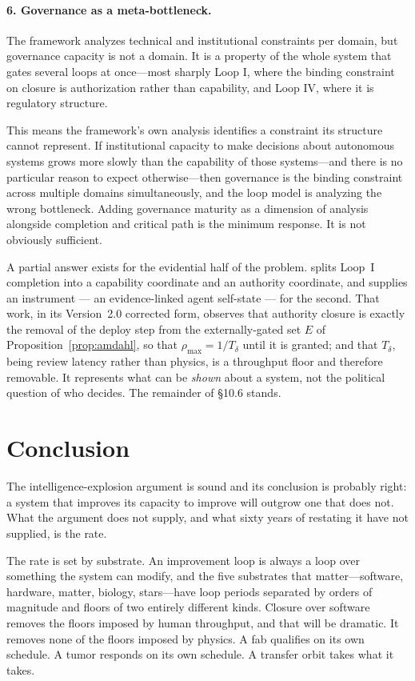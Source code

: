 \documentclass[11pt]{article}
\begin{document}
\paragraph{6. Governance as a meta-bottleneck.} The framework analyzes technical and institutional constraints per domain, but governance capacity is not a domain. It is a property of the whole system that gates several loops at once---most sharply Loop I, where the binding constraint on closure is authorization rather than capability, and Loop IV, where it is regulatory structure.

This means the framework's own analysis identifies a constraint its structure cannot represent. If institutional capacity to make decisions about autonomous systems grows more slowly than the capability of those systems---and there is no particular reason to expect otherwise---then governance is the binding constraint across multiple domains simultaneously, and the loop model is analyzing the wrong bottleneck. Adding governance maturity as a dimension of analysis alongside completion and critical path is the minimum response. It is not obviously sufficient.

A partial answer exists for the evidential half of the problem. \citet{yang2026selfaware} splits Loop~I completion into a capability coordinate and an authority coordinate, and supplies an instrument --- an evidence-linked agent self-state --- for the second. That work, in its Version~2.0 corrected form, observes that authority closure is exactly the removal of the deploy step from the externally-gated set $E$ of Proposition~\ref{prop:amdahl}, so that $\rho_{\max}=1/T_\delta$ until it is granted; and that $T_\delta$, being review latency rather than physics, is a throughput floor and therefore removable. It represents what can be \emph{shown} about a system, not the political question of who decides. The remainder of \S10.6 stands.

\section{Conclusion}

The intelligence-explosion argument is sound and its conclusion is probably right: a system that improves its capacity to improve will outgrow one that does not. What the argument does not supply, and what sixty years of restating it have not supplied, is the rate.

The rate is set by substrate. An improvement loop is always a loop over something the system can modify, and the five substrates that matter---software, hardware, matter, biology, stars---have loop periods separated by orders of magnitude and floors of two entirely different kinds. Closure over software removes the floors imposed by human throughput, and that will be dramatic. It removes none of the floors imposed by physics. A fab qualifies on its own schedule. A tumor responds on its own schedule. A transfer orbit takes what it takes.
\end{document}
